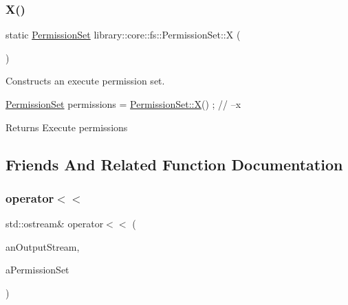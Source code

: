 \subsubsection{\texorpdfstring{X()}{X()}}
{\footnotesize\ttfamily static \hyperlink{classlibrary_1_1core_1_1fs_1_1PermissionSet}{Permission\+Set} library\+::core\+::fs\+::\+Permission\+Set\+::X (\begin{DoxyParamCaption}{ }\end{DoxyParamCaption})\hspace{0.3cm}{\ttfamily [static]}}



Constructs an execute permission set. 


\begin{DoxyCode}
\hyperlink{classlibrary_1_1core_1_1fs_1_1PermissionSet_a8a6eb39cc2a8bca92a657d065d3e36ba}{PermissionSet} permissions = \hyperlink{classlibrary_1_1core_1_1fs_1_1PermissionSet_a7f4717643d0b80b0b98104c357b3322f}{PermissionSet::X}() ; \textcolor{comment}{// --x}
\end{DoxyCode}


\begin{DoxyReturn}{Returns}
Execute permissions 
\end{DoxyReturn}


\subsection{Friends And Related Function Documentation}
\mbox{\label{classlibrary_1_1core_1_1fs_1_1PermissionSet_a8f2d68bb94d86dea76869abe148ea9f3}} 
\subsubsection{\texorpdfstring{operator$<$$<$}{operator<<}}
{\footnotesize\ttfamily std\+::ostream\& operator$<$$<$ (\begin{DoxyParamCaption}\item[{std\+::ostream \&}]{an\+Output\+Stream,  }\item[{const \hyperlink{classlibrary_1_1core_1_1fs_1_1PermissionSet}{Permission\+Set} \&}]{a\+Permission\+Set }\end{DoxyParamCaption})\hspace{0.3cm}{\ttfamily [friend]}}




